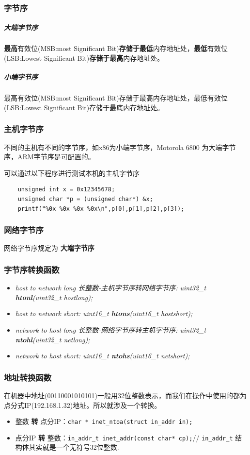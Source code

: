 \documentclass[UTF8,a4paper,12pt]{ctexbook}
\begin{document}
			\subsubsection{字节序}
				\subparagraph{大端字节序}
					\textbf{最高}有效位(MSB:most Significant Bit)\textbf{存储于最低}内存地址处，\textbf{最低}有效位(LSB:Lowest Significant Bit)\textbf{存储于最高}内存地址处。
					
				\subparagraph{小端字节序}
					最高有效位(MSB:most Significant Bit)存储于最高内存地址处，最低有效位(LSB:Lowest Significant Bit)存储于最底内存地址处。
			\subsubsection{主机字节序}
				不同的主机有不同的字节序，如x86为小端字节序，Motorola 6800 为大端字节序，ARM字节序是可配置的。
				
				可以通过以下程序进行测试本机的主机字节序
				\begin{lstlisting}
	unsigned int x = 0x12345678;
	unsigned char *p = (unsigned char*) &x;
	printf("%0x %0x %0x %0x\n",p[0],p[1],p[2],p[3]);				 
				\end{lstlisting}
			\subsubsection{网络字节序}网络字节序规定为 \textbf{大端字节序}
			
			\subsubsection{字节序转换函数}
				\begin{itemize}
					\item \textit{host to network long 长整数-主机字节序转网络字节序: uint32\_t \textbf{htonl}(uint32\_t hostlong);}
					\item \textit{host to network short:  uint16\_t \textbf{htons}(uint16\_t hostshort);}
					\item \textit{network to host long 长整数-网络字节序转主机字节序:  uint32\_t \textbf{ntohl}(uint32\_t netlong);}
					\item \textit{network to host short:  uint16\_t \textbf{ntohs}(uint16\_t netshort);}
				\end{itemize}
				
			\subsubsection{地址转换函数}
				在机器中地址(00110001010101)一般用32位整数表示，而我们在操作中使用的都为点分式IP(192.168.1.32)地址。所以就涉及一个转换。
				\begin{itemize}
					\item 整数 \textbf{转} 点分IP：\verb|char * inet_ntoa(struct in_addr in);|
					\item 点分IP \textbf{转} 整数：\verb|in_addr_t inet_addr(const char* cp);|// \verb|in_addr_t| 结构体其实就是一个无符号32位整数.
				\end{itemize}
			
\end{document}
